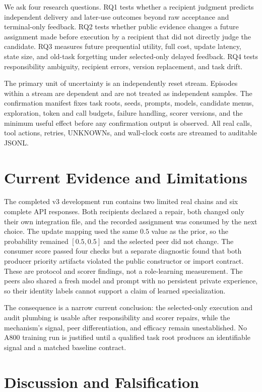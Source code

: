 \documentclass[sigconf,anonymous]{aamas}
\begin{document}
We ask four research questions. RQ1 tests whether a recipient judgment predicts independent
delivery and later-use outcomes beyond raw acceptance and terminal-only feedback. RQ2 tests
whether public evidence changes a future assignment made before execution by a recipient
that did not directly judge the candidate. RQ3 measures future prequential utility, full
cost, update latency, state size, and old-task forgetting under selected-only delayed
feedback. RQ4 tests responsibility ambiguity, recipient errors, version replacement, and
task drift.

The primary unit of uncertainty is an independently reset stream. Episodes within a stream
are dependent and are not treated as independent samples. The confirmation manifest fixes
task roots, seeds, prompts, models, candidate menus, exploration, token and call budgets,
failure handling, scorer versions, and the minimum useful effect before any confirmation
output is observed. All real calls, tool actions, retries, UNKNOWNs, and wall-clock costs
are streamed to auditable JSONL.

\section{Current Evidence and Limitations}

The completed v3 development run contains two limited real chains and six complete API
responses. Both recipients declared a repair, both changed only their own integration file,
and the recorded assignment was consumed by the next choice. The update mapping used the
same $0.5$ value as the prior, so the probability remained $[0.5,0.5]$ and the selected
peer did not change. The consumer score passed four checks but a separate diagnostic found
that both producer priority artifacts violated the public constructor or import contract.
These are protocol and scorer findings, not a role-learning measurement. The peers also
shared a fresh model and prompt with no persistent private experience, so their identity
labels cannot support a claim of learned specialization.

The consequence is a narrow current conclusion: the selected-only execution and audit
plumbing is usable after responsibility and scorer repairs, while the mechanism's signal,
peer differentiation, and efficacy remain unestablished. No A800 training run is justified
until a qualified task root produces an identifiable signal and a matched baseline contract.

\section{Discussion and Falsification}
\end{document}
